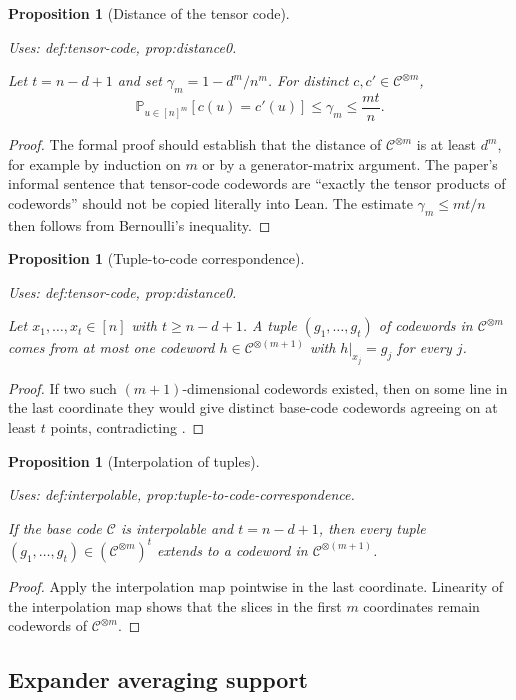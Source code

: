 \documentclass{article}
\providecommand{\uses}[1]{\par\smallskip\noindent\emph{Uses:} #1.\par\smallskip}
\newtheorem{proposition}[definition]{Proposition}
\theoremstyle{remark}
\newcommand{\Prb}{\mathbb{P}}
\newcommand{\code}{\mathcal{C}}
\begin{document}
\begin{proposition}[Distance of the tensor code]\label{prop:distance}
  \uses{def:tensor-code, prop:distance0}
  Let $t=n-d+1$ and set $\gamma_m=1-d^m/n^m$. For distinct $c,c'\in \code^{\otimes m}$,
  \[
    \Prb_{u\in [n]^m}[c(u)=c'(u)]\le \gamma_m\le \frac{mt}{n}.
  \]
\end{proposition}
\begin{proof}
  The formal proof should establish that the distance of $\code^{\otimes m}$ is at least $d^m$, for example by induction on $m$ or by a generator-matrix argument. The paper's informal sentence that tensor-code codewords are ``exactly the tensor products of codewords'' should not be copied literally into Lean. The estimate $\gamma_m\le mt/n$ then follows from Bernoulli's inequality.
\end{proof}

\begin{proposition}[Tuple-to-code correspondence]\label{prop:tuple-to-code-correspondence}
  \uses{def:tensor-code, prop:distance0}
  Let $x_1,\dots,x_t\in [n]$ with $t\ge n-d+1$. A tuple $(g_1,\dots,g_t)$ of codewords in $\code^{\otimes m}$ comes from at most one codeword $h\in \code^{\otimes (m+1)}$ with $h|_{x_j}=g_j$ for every $j$.
\end{proposition}
\begin{proof}
  If two such $(m+1)$-dimensional codewords existed, then on some line in the last coordinate they would give distinct base-code codewords agreeing on at least $t$ points, contradicting .
\end{proof}

\begin{proposition}[Interpolation of tuples]\label{prop:interpolate-tuple}
  \uses{def:interpolable, prop:tuple-to-code-correspondence}
  If the base code $\code$ is interpolable and $t=n-d+1$, then every tuple $(g_1,\dots,g_t)\in (\code^{\otimes m})^t$ extends to a codeword in $\code^{\otimes (m+1)}$.
\end{proposition}
\begin{proof}
  Apply the interpolation map pointwise in the last coordinate. Linearity of the interpolation map shows that the slices in the first $m$ coordinates remain codewords of $\code^{\otimes m}$.
\end{proof}

\subsection{Expander averaging support}
\end{document}
